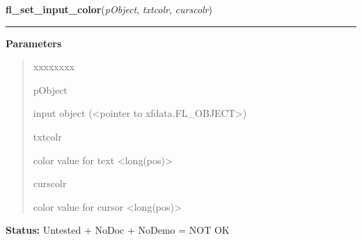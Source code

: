 \hspace{.8\funcindent}\begin{boxedminipage}{\funcwidth}

    \raggedright \textbf{fl\_set\_input\_color}(\textit{pObject}, \textit{txtcolr}, \textit{curscolr})

    \vspace{-1.5ex}

    \rule{\textwidth}{0.5\fboxrule}
\setlength{\parskip}{2ex}
\setlength{\parskip}{1ex}
      \textbf{Parameters}
      \vspace{-1ex}

      \begin{quote}
        \begin{Ventry}{xxxxxxxx}

          \item[pObject]

          input object ({\textless}pointer to 
          xfdata.FL\_OBJECT{\textgreater})

          \item[txtcolr]

          color value for text {\textless}long(pos){\textgreater}

          \item[curscolr]

          color value for cursor {\textless}long(pos){\textgreater}

        \end{Ventry}

      \end{quote}

\textbf{Status:} Untested + NoDoc + NoDemo = NOT OK



    \end{boxedminipage}

    \label{xformslib:library:fl_get_input_color}

    \vspace{0.5ex}

